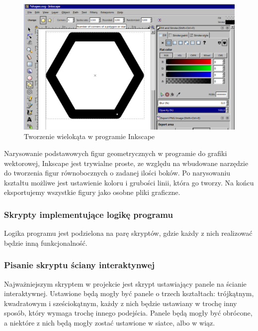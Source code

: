 \documentclass{article} %
\begin{document}
            \begin{figure}[h]
            \centering
            \includegraphics[bb=0 0 916 544,scale=0.35,keepaspectratio=true]{images/screenshots/work/6-tworzenie-ui_002.png}
            \caption{Tworzenie wielokąta w programie Inkscape}
            \end{figure}

            Narysowanie podstawowych figur geometrycznych w programie do grafiki wektorowej, Inkscape jest trywialne proste, ze względu na wbudowane narzędzie do tworzenia figur równobocznych o zadanej ilości boków. Po narysowaniu kształtu możliwe jest ustawienie koloru i grubości linii, która go tworzy. Na końcu eksportujemy wszystkie figury jako osobne pliki graficzne.
            \\
        
        \subsubsection{Skrypty implementujące logikę programu}
            Logika programu jest podzielona na parę skryptów, gdzie każdy z nich realizować będzie inną funkcjonalność. 
            
            
        \subsubsection*{Pisanie skryptu ściany interaktynwej}
            Najważniejszym skryptem w projekcie jest skrypt ustawiający panele na ścianie interaktywnej. Ustawione będą mogły być panele o trzech kształtach: trójkątnym, kwadratowym i sześciokątnym, każdy z nich będzie ustawiany w trochę inny sposób, który wymaga trochę innego podejścia. Panele będą mogły być obrócone, a niektóre z nich będą mogły zostać ustawione w siatce, albo w wiąz. 
            \\
            
\end{document}
